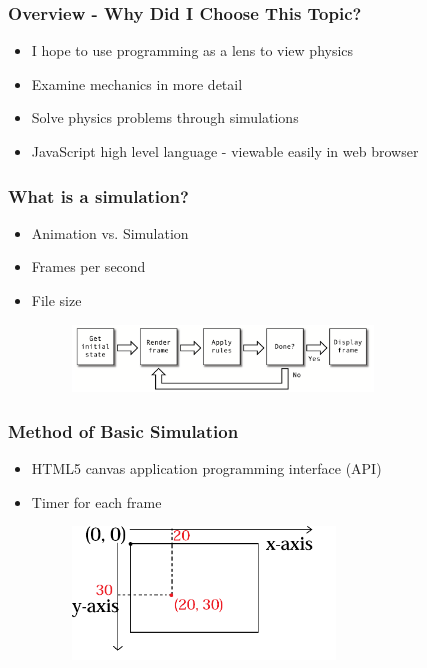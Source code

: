 \documentclass{beamer}
\begin{document}
\begin{frame}
\frametitle{Overview - Why Did I Choose This Topic?}
\begin{itemize}
\item I hope to use programming as a lens to view physics
\item Examine mechanics in more detail
\item Solve physics problems through simulations
\item JavaScript high level language -  viewable easily in web browser

\end{itemize}
\end{frame}



\begin{frame}
\frametitle{What is a simulation?}

\begin{itemize}

\item Animation vs. Simulation
\item Frames per second
\item File size

\vspace{1cm}
\begin{figure}[h] 
	\centering
		\includegraphics[width=8cm]{frames.png}

	\label{fig:frames}
\end{figure}
\end{itemize}
\end{frame}






\begin{frame}
\frametitle{Method of Basic Simulation}
\begin{itemize}

\item HTML5 canvas application programming interface (API)
\item Timer for each frame

\vspace{1cm}
\begin{figure}[h] 
	\centering
		\includegraphics[width=7cm]{canvas.png}

	\label{fig:frames}
\end{figure}

\end{itemize}
\end{frame}
\end{document}
